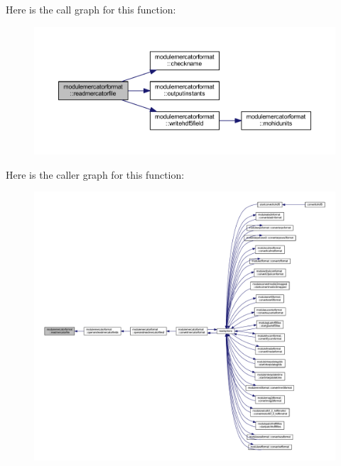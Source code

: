 Here is the call graph for this function\+:\nopagebreak
\begin{figure}[H]
\begin{center}
\leavevmode
\includegraphics[width=350pt]{namespacemodulemercatorformat_a2f894929004ec4d27c855864f3122541_cgraph}
\end{center}
\end{figure}
Here is the caller graph for this function\+:\nopagebreak
\begin{figure}[H]
\begin{center}
\leavevmode
\includegraphics[width=350pt]{namespacemodulemercatorformat_a2f894929004ec4d27c855864f3122541_icgraph}
\end{center}
\end{figure}
\mbox{\label{namespacemodulemercatorformat_a4f174ab179c1ebc3bd16e672df98d3e2}} 
